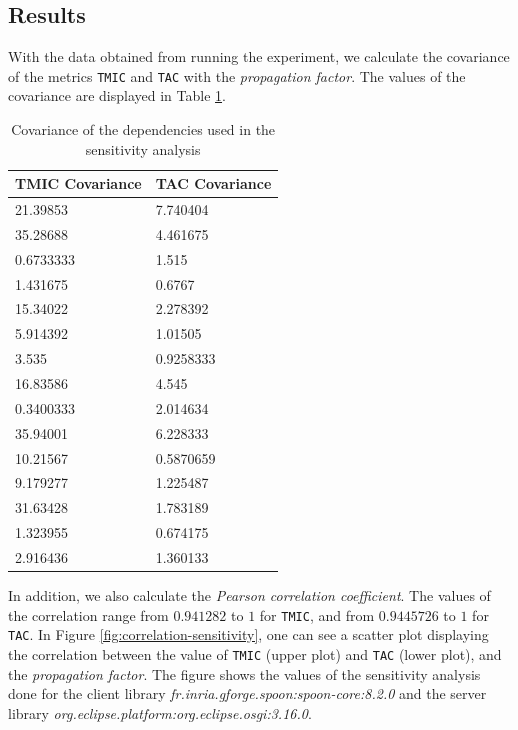 \subsection{Results}
With the data obtained from running the experiment, we calculate the covariance of the metrics \texttt{TMIC} and \texttt{TAC} with the \textit{propagation factor}. The values of the covariance are displayed in Table \ref{table:covariance-sensitivity}.

\begin{table}[ht!]
\begin{center}
\begin{tabular}{|l|l|}
\hline
\textbf{TMIC Covariance} & \textbf{TAC Covariance} \\ \hline
21.39853 & 7.740404 \\ \hline
35.28688 & 4.461675 \\ \hline
0.6733333 & 1.515 \\ \hline
1.431675 & 0.6767 \\ \hline
15.34022 & 2.278392 \\ \hline
5.914392 & 1.01505 \\ \hline
3.535 & 0.9258333 \\ \hline
16.83586 & 4.545 \\ \hline
0.3400333 & 2.014634 \\ \hline
35.94001 & 6.228333 \\ \hline
10.21567 & 0.5870659 \\ \hline
9.179277 & 1.225487 \\ \hline
31.63428 & 1.783189 \\ \hline
1.323955 & 0.674175 \\ \hline
2.916436 & 1.360133 \\ \hline
\end{tabular}
\end{center}
\caption{Covariance of the dependencies used in the sensitivity analysis}
\label{table:covariance-sensitivity}
\end{table}

In addition, we also calculate the \textit{Pearson correlation coefficient}. The values of the correlation range from $0.941282$ to $1$ for \texttt{TMIC}, and from $0.9445726$ to $1$ for \texttt{TAC}. In Figure \ref{fig:correlation-sensitivity}, one can see a scatter plot displaying the correlation between the value of \texttt{TMIC} (upper plot) and \texttt{TAC} (lower plot), and the \textit{propagation factor}. The figure shows the values of the sensitivity analysis done for the client library \textit{fr.inria.gforge.spoon:spoon-core:8.2.0} and the server library \textit{org.eclipse.platform:org.eclipse.osgi:3.16.0}.


